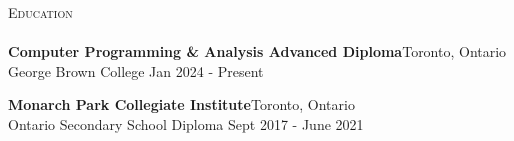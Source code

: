 \documentclass[12pt,a4paper]{article}
\newcommand{\lineunder} {
    \vspace*{-8pt} \\
    \hspace*{-18pt} \hrulefill \\
}
\newcommand{\header} [1] {
    {\hspace*{-18pt}\vspace*{6pt} \textsc{#1}}
    \vspace*{-6pt} \lineunder
}
\begin{document}
\header{Education}
\textbf{Computer Programming \& Analysis Advanced Diploma}\hfill Toronto, Ontario\\
George Brown College \hfill Jan 2024 - Present\\
\vspace{3mm}

\textbf{Monarch Park Collegiate Institute}\hfill Toronto, Ontario\\
Ontario Secondary School Diploma \hfill Sept 2017 - June 2021\\
\vspace{4mm}
\end{document}
